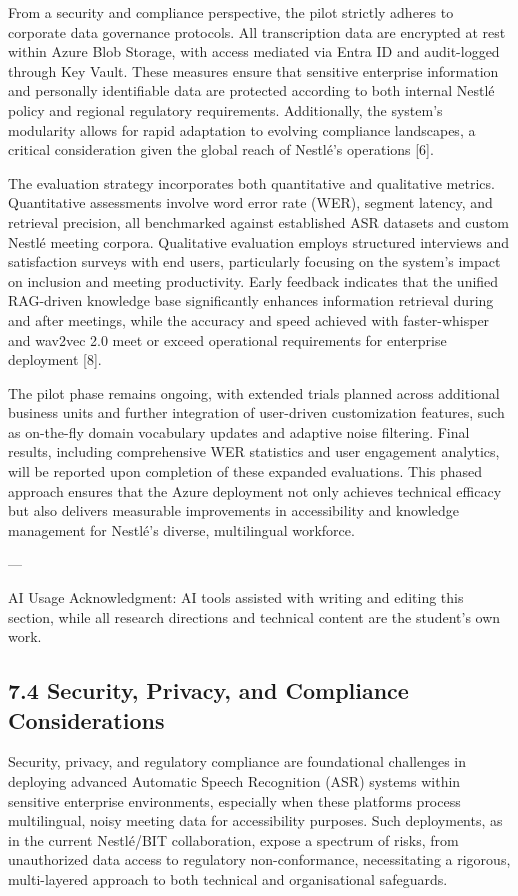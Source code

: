 \documentclass[12pt,a4paper]{article}
\begin{document}
From a security and compliance perspective, the pilot strictly adheres to corporate data governance protocols. All transcription data are encrypted at rest within Azure Blob Storage, with access mediated via Entra ID and audit-logged through Key Vault. These measures ensure that sensitive enterprise information and personally identifiable data are protected according to both internal Nestlé policy and regional regulatory requirements. Additionally, the system’s modularity allows for rapid adaptation to evolving compliance landscapes, a critical consideration given the global reach of Nestlé’s operations [6].


The evaluation strategy incorporates both quantitative and qualitative metrics. Quantitative assessments involve word error rate (WER), segment latency, and retrieval precision, all benchmarked against established ASR datasets and custom Nestlé meeting corpora. Qualitative evaluation employs structured interviews and satisfaction surveys with end users, particularly focusing on the system’s impact on inclusion and meeting productivity. Early feedback indicates that the unified RAG-driven knowledge base significantly enhances information retrieval during and after meetings, while the accuracy and speed achieved with faster-whisper and wav2vec 2.0 meet or exceed operational requirements for enterprise deployment [8].


The pilot phase remains ongoing, with extended trials planned across additional business units and further integration of user-driven customization features, such as on-the-fly domain vocabulary updates and adaptive noise filtering. Final results, including comprehensive WER statistics and user engagement analytics, will be reported upon completion of these expanded evaluations. This phased approach ensures that the Azure deployment not only achieves technical efficacy but also delivers measurable improvements in accessibility and knowledge management for Nestlé’s diverse, multilingual workforce.


---


AI Usage Acknowledgment: AI tools assisted with writing and editing this section, while all research directions and technical content are the student’s own work.


\subsection{7.4 Security, Privacy, and Compliance Considerations}


Security, privacy, and regulatory compliance are foundational challenges in deploying advanced Automatic Speech Recognition (ASR) systems within sensitive enterprise environments, especially when these platforms process multilingual, noisy meeting data for accessibility purposes. Such deployments, as in the current Nestlé/BIT collaboration, expose a spectrum of risks, from unauthorized data access to regulatory non-conformance, necessitating a rigorous, multi-layered approach to both technical and organisational safeguards.
\end{document}
